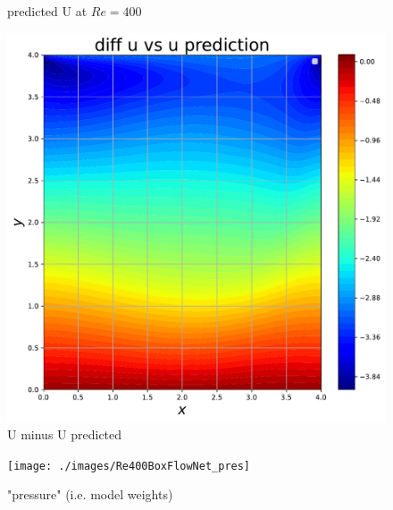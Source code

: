 \documentclass{article}
\begin{document}
\begin{figure}[htb!]
		\caption{predicted U at $Re = 400$}
\label{fig:u_pred}
		\endminipage\hfill
		\includegraphics[width=\linewidth]{./images/Re400BoxFlowNet_diff_u}
		\caption{U minus U predicted}
		\label{fig:u_diff}\hfill
		
		\endminipage
	\end{figure}

	\begin{figure}[htb!]
		\centering
		\texttt{[image: ./images/Re400BoxFlowNet\_pres]}
		\caption{"pressure" (i.e. model weights)}\label{fig:pred_pres}
		\label{fig:SIMPLE_pres2}
	\end{figure}
	
\end{document}
